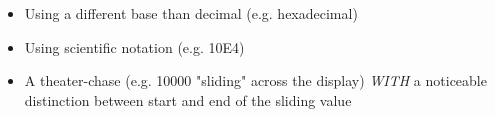 \documentclass{article}
\begin{document}
        \begin{itemize}
            \item Using a different base than decimal (e.g. hexadecimal)
            \item Using scientific notation (e.g. 10E4)
            \item A theater-chase (e.g. 10000 "sliding" across the display) \textit{WITH} a noticeable distinction between start and end of the sliding value
        \end{itemize}
\end{document}
